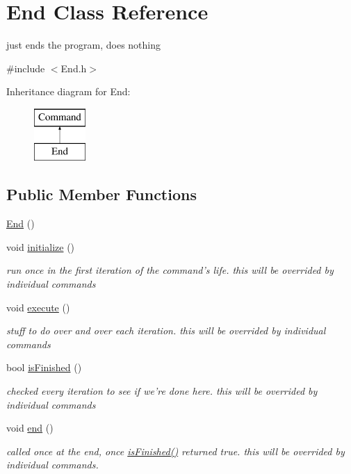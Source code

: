 \hypertarget{classEnd}{\section{End Class Reference}
\label{classEnd}
}


just ends the program, does nothing  




{\ttfamily \#include $<$End.\-h$>$}

Inheritance diagram for End\-:\begin{figure}[H]
\begin{center}
\leavevmode
\includegraphics[height=2.000000cm]{classEnd}
\end{center}
\end{figure}
\subsection*{Public Member Functions}
\begin{DoxyCompactItemize}
\item 
\hyperlink{classEnd_acd25fa8f481c50f5b8eaff4af1159942}{End} ()
\item 
void \hyperlink{classEnd_a0f844207902db51f8992c2a1f23a47d9}{initialize} ()
\begin{DoxyCompactList}\small\item\em run once in the first iteration of the command's life. this will be overrided by individual commands \end{DoxyCompactList}\item 
void \hyperlink{classEnd_a45a7411a23472e3297b48b6760a0d331}{execute} ()
\begin{DoxyCompactList}\small\item\em stuff to do over and over each iteration. this will be overrided by individual commands \end{DoxyCompactList}\item 
bool \hyperlink{classEnd_a2e5c37f16b83f9e354b34ee3ed63aae8}{is\-Finished} ()
\begin{DoxyCompactList}\small\item\em checked every iteration to see if we're done here. this will be overrided by individual commands \end{DoxyCompactList}\item 
void \hyperlink{classEnd_a84e2ceb14d9465c580c162a26fa3e6de}{end} ()
\begin{DoxyCompactList}\small\item\em called once at the end, once \hyperlink{classEnd_a2e5c37f16b83f9e354b34ee3ed63aae8}{is\-Finished()} returned true. this will be overrided by individual commands. \end{DoxyCompactList}\end{DoxyCompactItemize}
